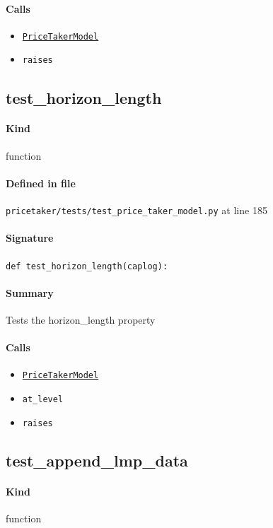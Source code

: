 \documentclass[11pt]{report}
\begin{document}
\paragraph{Calls}
\begin{itemize}[leftmargin=*]
  \item \hyperref[def:pricetaker-price_taker_model.py:PriceTakerModel:L161]{\texttt{PriceTakerModel}}
  \item \texttt{raises}
\end{itemize}
\subsection{test\_horizon\_length}
\label{def:pricetaker-tests-test_price_taker_model.py:test_horizon_length:L185}
\paragraph{Kind} function
\paragraph{Defined in file} \texttt{pricetaker/tests/test\_price\_taker\_model.py} at line 185
\paragraph{Signature} \texttt{def test\_horizon\_length(caplog):}
\paragraph{Summary} Tests the horizon\_length property
\paragraph{Calls}
\begin{itemize}[leftmargin=*]
  \item \hyperref[def:pricetaker-price_taker_model.py:PriceTakerModel:L161]{\texttt{PriceTakerModel}}
  \item \texttt{at\_level}
  \item \texttt{raises}
\end{itemize}
\subsection{test\_append\_lmp\_data}
\label{def:pricetaker-tests-test_price_taker_model.py:test_append_lmp_data:L226}
\paragraph{Kind} function
\end{document}
